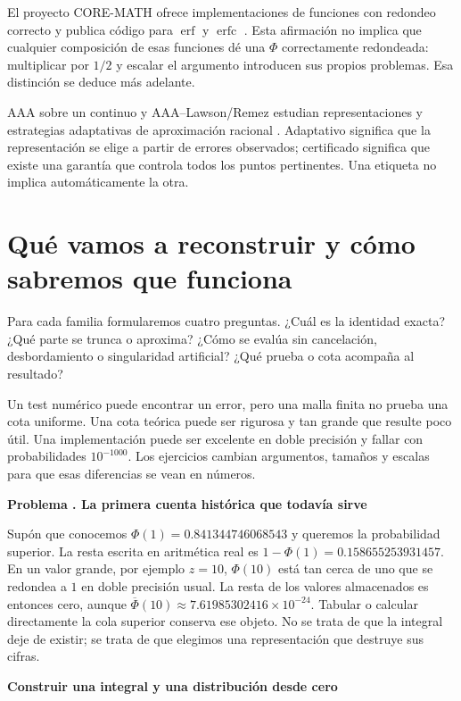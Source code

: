 \documentclass[11pt,a4paper]{article}
\theoremstyle{definition}
\newcommand{\parte}[1]{\par\bigskip\Needspace{8\baselineskip}\begin{center}{\Large\bfseries\color{azul}#1}\end{center}}
\DeclareMathOperator{\erf}{erf}
\DeclareMathOperator{\erfc}{erfc}
\newcounter{problema}
\newenvironment{resuelto}[1]{\refstepcounter{problema}\par\medskip\Needspace{6\baselineskip}\textbf{Problema \theproblema. #1}\par}{\par\medskip}
\newcommand{\SF}{\overline\Phi}
\begin{document}
El proyecto CORE-MATH ofrece implementaciones de funciones con redondeo correcto y publica código para $\erf$ y $\erfc$ \cite{coreactual}. Esta afirmación no implica que cualquier composición de esas funciones dé una $\Phi$ correctamente redondeada: multiplicar por $1/2$ y escalar el argumento introducen sus propios problemas. Esa distinción se deduce más adelante.

AAA sobre un continuo y AAA--Lawson/Remez estudian representaciones y estrategias adaptativas de aproximación racional \cite{continuoactual,lawsonactual}. Adaptativo significa que la representación se elige a partir de errores observados; certificado significa que existe una garantía que controla todos los puntos pertinentes. Una etiqueta no implica automáticamente la otra.

\section{Qué vamos a reconstruir y cómo sabremos que funciona}
Para cada familia formularemos cuatro preguntas. ¿Cuál es la identidad exacta? ¿Qué parte se trunca o aproxima? ¿Cómo se evalúa sin cancelación, desbordamiento o singularidad artificial? ¿Qué prueba o cota acompaña al resultado?

Un test numérico puede encontrar un error, pero una malla finita no prueba una cota uniforme. Una cota teórica puede ser rigurosa y tan grande que resulte poco útil. Una implementación puede ser excelente en doble precisión y fallar con probabilidades $10^{-1000}$. Los ejercicios cambian argumentos, tamaños y escalas para que esas diferencias se vean en números.

\begin{resuelto}{La primera cuenta histórica que todavía sirve}
Supón que conocemos $\Phi(1)=0.841344746068543$ y queremos la probabilidad superior. La resta escrita en aritmética real es
$1-\Phi(1)=0.158655253931457$.
En un valor grande, por ejemplo $z=10$, $\Phi(10)$ está tan cerca de uno que se redondea a $1$ en doble precisión usual. La resta de los valores almacenados es entonces cero, aunque
$\SF(10)\approx7.61985302416\times10^{-24}$.
Tabular o calcular directamente la cola superior conserva ese objeto. No se trata de que la integral deje de existir; se trata de que elegimos una representación que destruye sus cifras.
\end{resuelto}



\parte{Construir una integral y una distribución desde cero}
\end{document}
